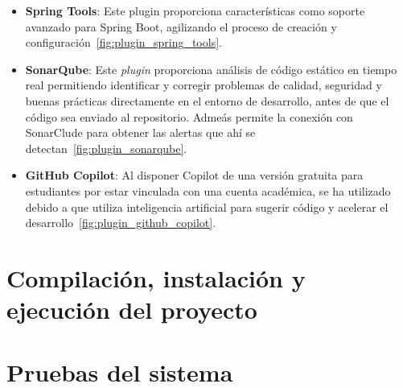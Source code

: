 \begin{itemize}
   \item \textbf{Spring Tools}: Este plugin proporciona características como soporte avanzado para Spring Boot, agilizando el proceso de creación y configuración~\ref{fig:plugin_spring_tools}.
   
   
   \item \textbf{SonarQube}: Este \emph{plugin} proporciona análisis de código estático en tiempo real permitiendo identificar y corregir problemas de calidad, seguridad y buenas prácticas directamente en el entorno de desarrollo, antes de que el código sea enviado al repositorio. Admeás permite la conexión con SonarClude para obtener las alertas que ahí se detectan~\ref{fig:plugin_sonarqube}.

   
   \item \textbf{GitHub Copilot}: Al disponer Copilot de una versión gratuita para estudiantes por estar vinculada con una cuenta académica, se ha utilizado debido a que utiliza inteligencia
artificial para sugerir código y acelerar el desarrollo~\ref{fig:plugin_github_copilot}.


\end{itemize}




\section{Compilación, instalación y ejecución del proyecto}

\section{Pruebas del sistema}
